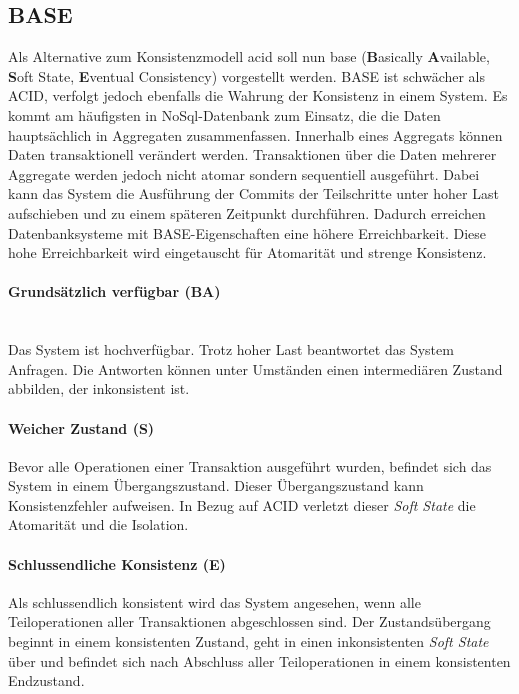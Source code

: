 \subsection{BASE}
Als Alternative zum Konsistenzmodell \acrshort{acid} soll nun \acrshort{base} (\textbf{B}asically \textbf{A}vailable, \textbf{S}oft State, \textbf{E}ventual Consistency) vorgestellt werden. BASE ist schwächer als ACID, verfolgt jedoch ebenfalls die Wahrung der Konsistenz in einem System. Es kommt am häufigsten in NoSql-Datenbank zum Einsatz, die die Daten hauptsächlich in Aggregaten zusammenfassen. Innerhalb eines Aggregats können Daten transaktionell verändert werden. Transaktionen über die Daten mehrerer Aggregate werden jedoch nicht atomar sondern sequentiell ausgeführt. Dabei kann das System die Ausführung der Commits der Teilschritte unter hoher Last aufschieben und zu einem späteren Zeitpunkt durchführen. Dadurch erreichen Datenbanksysteme mit BASE-Eigenschaften eine höhere Erreichbarkeit. Diese hohe Erreichbarkeit wird eingetauscht für Atomarität und strenge Konsistenz\cite{SadalagePramodJ.andFowlerMartin.2012}. 

\paragraph*{Grundsätzlich verfügbar (BA)}\mbox{}\\
Das System ist hochverfügbar. Trotz hoher Last beantwortet das System Anfragen. Die Antworten können unter Umständen einen intermediären Zustand abbilden, der inkonsistent ist. 

\paragraph*{Weicher Zustand (S)}
Bevor alle Operationen einer Transaktion ausgeführt wurden, befindet sich das System in einem Übergangszustand. Dieser Übergangszustand kann Konsistenzfehler aufweisen. In Bezug auf ACID verletzt dieser \textit{Soft State} die Atomarität und die Isolation.

\paragraph*{Schlussendliche Konsistenz (E)}
Als schlussendlich konsistent wird das System angesehen, wenn alle Teiloperationen aller Transaktionen abgeschlossen sind. Der Zustandsübergang beginnt in einem konsistenten Zustand, geht in einen inkonsistenten \textit{Soft State} über und befindet sich nach Abschluss aller Teiloperationen in einem konsistenten Endzustand. 

